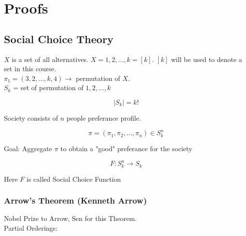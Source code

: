 \chapter{Proofs}

\section{Social Choice Theory}

$X$ is a set of all alternatives. $X = {1, 2, \dots, k} = [k]$.
$[k]$ will be used to denote a set in this course.\\

$\pi_1 = (3, 2, \dots, k, 4) \rightarrow$ permutation of $X$.\\

$S_k$ = set of permutation of ${1, 2, \dots, k}$

$$
|S_k| = k!
$$

Society consists of $n$ people preferance profile.

$$
\pi = (\pi_1, \pi_2, \dots, \pi_n) \in S_{k}^{n}
$$

Goal: Aggregate $\pi$ to obtain a "good" preferance
for the society

$$
F: S_{k}^{n} \rightarrow S_k
$$

Here $F$ is called Social Choice Function

\subsection{Arrow's Theorem (Kenneth Arrow)}

Nobel Prize to Arrow, Sen for this Theorem.\\

Partial Orderings: 
